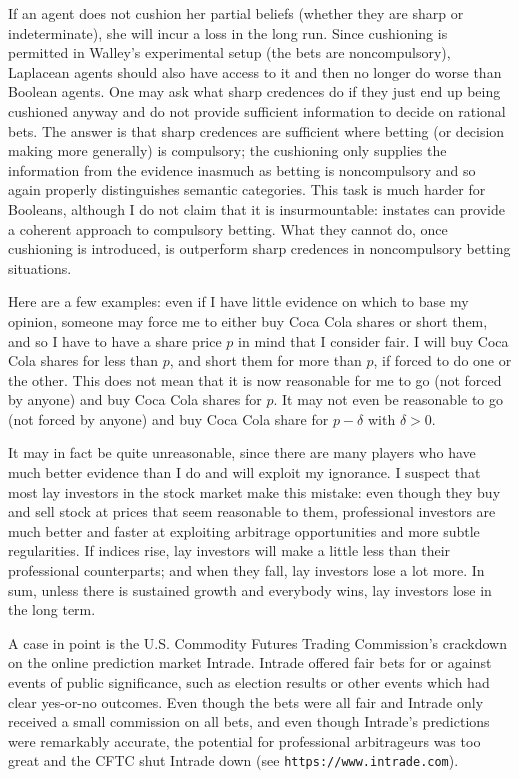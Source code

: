 \documentclass[11pt]{article}
\begin{document}
If an agent does not cushion her partial beliefs (whether they are
sharp or indeterminate), she will incur a loss in the long run. Since
cushioning is permitted in Walley's experimental setup (the bets are
noncompulsory), Laplacean agents should also have access to it and
then no longer do worse than Boolean agents. One may ask what sharp
credences do if they just end up being cushioned anyway and do not
provide sufficient information to decide on rational bets. The answer
is that sharp credences are sufficient where betting (or decision
making more generally) is compulsory; the cushioning only supplies the
information from the evidence inasmuch as betting is noncompulsory and
so again properly distinguishes semantic categories. This task is much
harder for Booleans, although I do not claim that it is
insurmountable: instates can provide a coherent approach to compulsory
betting. What they cannot do, once cushioning is introduced, is
outperform sharp credences in noncompulsory betting situations.

Here are a few examples: even if I have little evidence on which to
base my opinion, someone may force me to either buy Coca Cola shares
or short them, and so I have to have a share price $p$ in mind that I
consider fair. I will buy Coca Cola shares for less than $p$, and
short them for more than $p$, if forced to do one or the other. This
does not mean that it is now reasonable for me to go (not forced by
anyone) and buy Coca Cola shares for $p$. It may not even be
reasonable to go (not forced by anyone) and buy Coca Cola share for
$p-\delta$ with $\delta{}>0$.

It may in fact be quite unreasonable, since there are many players who
have much better evidence than I do and will exploit my ignorance. I
suspect that most lay investors in the stock market make this mistake:
even though they buy and sell stock at prices that seem reasonable to
them, professional investors are much better and faster at exploiting
arbitrage opportunities and more subtle regularities. If indices rise,
lay investors will make a little less than their professional
counterparts; and when they fall, lay investors lose a lot more. In
sum, unless there is sustained growth and everybody wins, lay
investors lose in the long term.

A case in point is the U.S. Commodity Futures Trading Commission's
crackdown on the online prediction market Intrade. Intrade offered
fair bets for or against events of public significance, such as
election results or other events which had clear yes-or-no outcomes.
Even though the bets were all fair and Intrade only received a small
commission on all bets, and even though Intrade's predictions were
remarkably accurate, the potential for professional arbitrageurs was
too great and the CFTC shut Intrade down (see
\texttt{https://www.intrade.com}).
\end{document}

